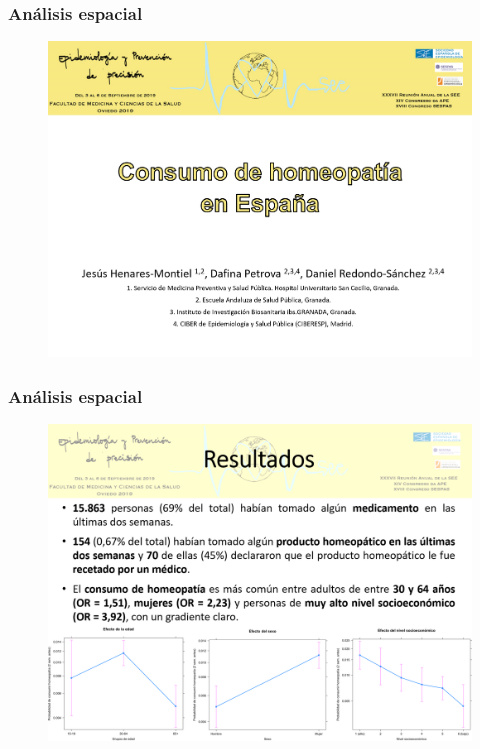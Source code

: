 \documentclass{beamer}
\begin{document}
\begin{frame}\frametitle{Análisis espacial}
	\begin{figure}
		\centering
		\includegraphics[width=.85\textwidth]{images/homeopatia1.png}
	\end{figure}
\end{frame}


\begin{frame}\frametitle{Análisis espacial}
	\begin{figure}
		\centering
		\includegraphics[width=.85\textwidth]{images/homeopatia2.png}
	\end{figure}
\end{frame}

\end{document}
